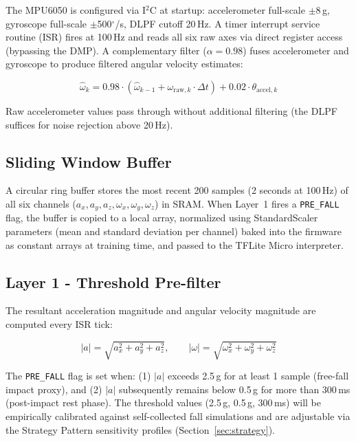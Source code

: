 The MPU6050 is configured via I$^2$C at startup: accelerometer full-scale $\pm$8\,g, gyroscope full-scale $\pm$500$^\circ$/s, DLPF cutoff 20\,Hz. A timer interrupt service routine (ISR) fires at 100\,Hz and reads all six raw axes via direct register access (bypassing the DMP). A complementary filter ($\alpha = 0.98$) fuses accelerometer and gyroscope to produce filtered angular velocity estimates:

\begin{equation}
	\hat{\omega}_{k} = 0.98 \cdot (\hat{\omega}_{k-1} + \omega_{\text{raw},k} \cdot \Delta t) + 0.02 \cdot \theta_{\text{accel},k}
\end{equation}

Raw accelerometer values pass through without additional filtering (the DLPF suffices for noise rejection above 20\,Hz).

\subsection{Sliding Window Buffer}

A circular ring buffer stores the most recent 200 samples (2 seconds at 100\,Hz) of all six channels ($a_x, a_y, a_z, \omega_x, \omega_y, \omega_z$) in SRAM. When Layer~1 fires a \texttt{PRE\_FALL} flag, the buffer is copied to a local array, normalized using StandardScaler parameters (mean and standard deviation per channel) baked into the firmware as constant arrays at training time, and passed to the TFLite Micro interpreter.

\subsection{Layer 1 - Threshold Pre-filter}

The resultant acceleration magnitude and angular velocity magnitude are computed every ISR tick:

\begin{equation}
	|a| = \sqrt{a_x^2 + a_y^2 + a_z^2}, \qquad |\omega| = \sqrt{\omega_x^2 + \omega_y^2 + \omega_z^2}
\end{equation}

The \texttt{PRE\_FALL} flag is set when: (1) $|a|$ exceeds 2.5\,g for at least 1 sample (free-fall impact proxy), and (2) $|a|$ subsequently remains below 0.5\,g for more than 300\,ms (post-impact rest phase). The threshold values (2.5\,g, 0.5\,g, 300\,ms) will be empirically calibrated against self-collected fall simulations and are adjustable via the Strategy Pattern sensitivity profiles (Section~\ref{sec:strategy}).

